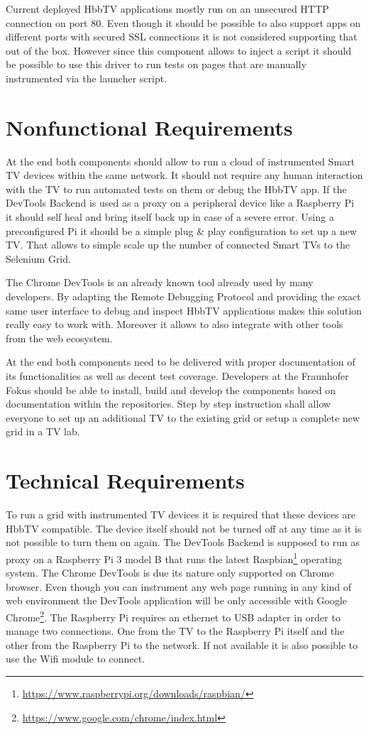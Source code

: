 Current deployed HbbTV applications mostly run on an unsecured HTTP connection on port 80.
Even though it should be possible to also support apps on different ports with secured SSL
connections it is not considered supporting that out of the box. However since this component
allows to inject a script it should be possible to use this driver to run tests on pages that
are manually instrumented via the launcher script.

\section{Nonfunctional Requirements\label{sec:techreq}}

At the end both components should allow to run a cloud of instrumented Smart TV devices
within the same network. It should not require any human interaction with the TV to run
automated tests on them or debug the HbbTV app. If the DevTools Backend is used as a
proxy on a peripheral device like a Raspberry Pi it should self heal and bring itself back
up in case of a severe error. Using a preconfigured Pi it should be a simple plug \& play
configuration to set up a new TV. That allows to simple scale up the number of connected
Smart TVs to the Selenium Grid.

The Chrome DevTools is an already known tool already used by many developers. By adapting
the Remote Debugging Protocol and providing the exact same user interface to debug and inspect
HbbTV applications makes this solution really easy to work with. Moreover it allows to
also integrate with other tools from the web ecosystem.

At the end both components need to be delivered with proper documentation of its
functionalities as well as decent test coverage. Developers at the Fraunhofer Fokus should
be able to install, build and develop the components based on documentation within the
repositories. Step by step instruction shall allow everyone to set up an additional TV
to the existing grid or setup a complete new grid in a TV lab.

\section{Technical Requirements\label{sec:techreq}}

To run a grid with instrumented TV devices it is required that these devices are HbbTV
compatible. The device itself should not be turned off at any time as it is not possible
to turn them on again. The DevTools Backend is supposed to run as proxy on a Raspberry Pi 3
model B that runs the latest Raspbian\footnote{\url{https://www.raspberrypi.org/downloads/raspbian/}}
operating system. The Chrome DevTools is due its nature only supported on Chrome browser.
Even though you can instrument any web page running in any kind of web environment the DevTools
application will be only accessible with Google Chrome\footnote{\url{https://www.google.com/chrome/index.html}}.
The Raspberry Pi requires an ethernet to USB adapter in order to manage two connections.
One from the TV to the Raspberry Pi itself and the other from the Raspberry Pi to the network.
If not available it is also possible to use the Wifi module to connect.

